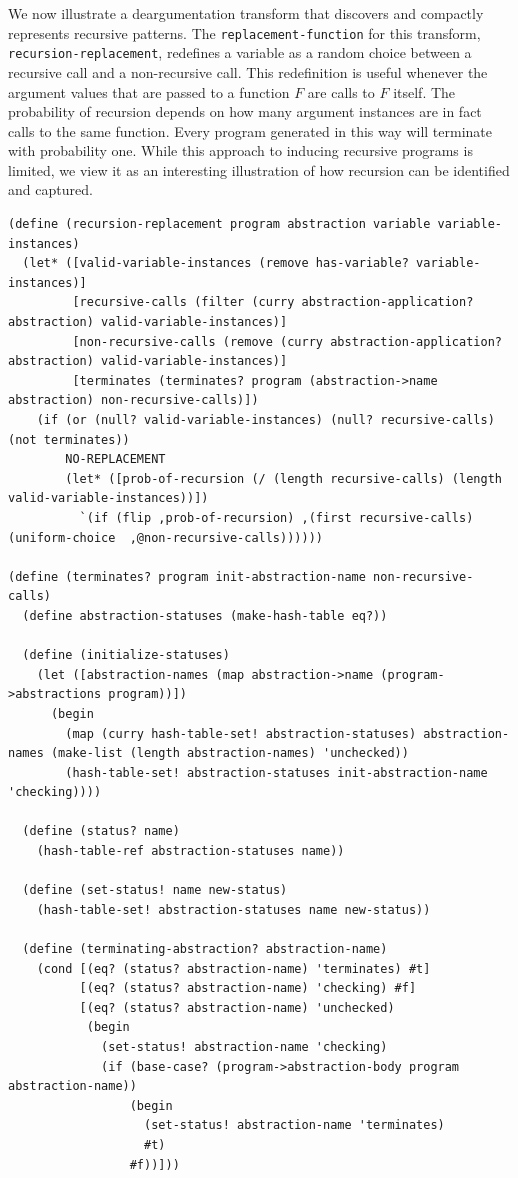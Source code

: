 \documentclass[a4paper,10pt]{article}
\begin{document}
We now illustrate a deargumentation transform that discovers and compactly represents recursive patterns. The \texttt{replacement-function} for this transform, \texttt{recursion-replacement}, redefines a variable as a random choice between a recursive call and a non-recursive call. This redefinition is useful whenever the argument values that are passed to a function $F$ are calls to $F$ itself. The probability of recursion depends on how many argument instances are in fact   calls to the same function. Every program generated in this way will terminate with probability one. While this approach to inducing recursive programs is limited, we view it as an interesting illustration of how recursion can be identified and captured.
\begin{lstlisting}[frame=trbl]
(define (recursion-replacement program abstraction variable variable-instances)
  (let* ([valid-variable-instances (remove has-variable? variable-instances)]
         [recursive-calls (filter (curry abstraction-application? abstraction) valid-variable-instances)]
         [non-recursive-calls (remove (curry abstraction-application? abstraction) valid-variable-instances)]
         [terminates (terminates? program (abstraction->name abstraction) non-recursive-calls)]) 
    (if (or (null? valid-variable-instances) (null? recursive-calls) (not terminates))
        NO-REPLACEMENT
        (let* ([prob-of-recursion (/ (length recursive-calls) (length valid-variable-instances))])
          `(if (flip ,prob-of-recursion) ,(first recursive-calls) (uniform-choice  ,@non-recursive-calls))))))

(define (terminates? program init-abstraction-name non-recursive-calls)
  (define abstraction-statuses (make-hash-table eq?))

  (define (initialize-statuses)
    (let ([abstraction-names (map abstraction->name (program->abstractions program))])
      (begin
        (map (curry hash-table-set! abstraction-statuses) abstraction-names (make-list (length abstraction-names) 'unchecked))
        (hash-table-set! abstraction-statuses init-abstraction-name 'checking))))

  (define (status? name)
    (hash-table-ref abstraction-statuses name))

  (define (set-status! name new-status)
    (hash-table-set! abstraction-statuses name new-status))
  
  (define (terminating-abstraction? abstraction-name)
    (cond [(eq? (status? abstraction-name) 'terminates) #t]
          [(eq? (status? abstraction-name) 'checking) #f]
          [(eq? (status? abstraction-name) 'unchecked)
           (begin
             (set-status! abstraction-name 'checking)
             (if (base-case? (program->abstraction-body program abstraction-name))
                 (begin
                   (set-status! abstraction-name 'terminates)
                   #t)
                 #f))]))
  

\end{lstlisting}
\end{document}
